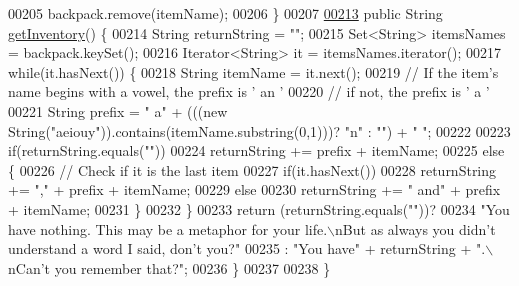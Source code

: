 \begin{DoxyCode}
00205         backpack.remove(itemName);
00206     \}
00207 
\hypertarget{Player_8java_source_l00213}{}\hyperlink{classPlayer_a5c4667e6eca93d1bba69f7db022f2feb}{00213}     \textcolor{keyword}{public} String \hyperlink{classPlayer_a5c4667e6eca93d1bba69f7db022f2feb}{getInventory}() \{
00214         String returnString = \textcolor{stringliteral}{""};
00215         Set<String> itemsNames = backpack.keySet();
00216         Iterator<String> it = itemsNames.iterator();
00217         \textcolor{keywordflow}{while}(it.hasNext()) \{
00218             String itemName = it.next();
00219             \textcolor{comment}{// If the item's name begins with a vowel, the prefix is ' an '}
00220             \textcolor{comment}{// if not, the prefix is ' a '}
00221             String prefix = \textcolor{stringliteral}{" a"} + (((\textcolor{keyword}{new} String(\textcolor{stringliteral}{"aeiouy"})).contains(itemName.substring(0,1)))? \textcolor{stringliteral}{"n"} : \textcolor{stringliteral}{""}) +
       \textcolor{stringliteral}{" "};
00222 
00223             \textcolor{keywordflow}{if}(returnString.equals(\textcolor{stringliteral}{""}))
00224                 returnString += prefix + itemName;
00225             \textcolor{keywordflow}{else} \{
00226                 \textcolor{comment}{// Check if it is the last item}
00227                 \textcolor{keywordflow}{if}(it.hasNext())
00228                     returnString += \textcolor{stringliteral}{","} + prefix + itemName;
00229                 \textcolor{keywordflow}{else}
00230                     returnString += \textcolor{stringliteral}{" and"} + prefix + itemName;
00231             \}
00232         \}
00233         \textcolor{keywordflow}{return} (returnString.equals(\textcolor{stringliteral}{""}))?
00234             \textcolor{stringliteral}{"You have nothing. This may be a metaphor for your life.\(\backslash\)nBut as always you didn't understand a
       word I said, don't you?"}
00235             : \textcolor{stringliteral}{"You have"} + returnString + \textcolor{stringliteral}{".\(\backslash\)nCan't you remember that?"};
00236     \}
00237 
00238 \}
\end{DoxyCode}
